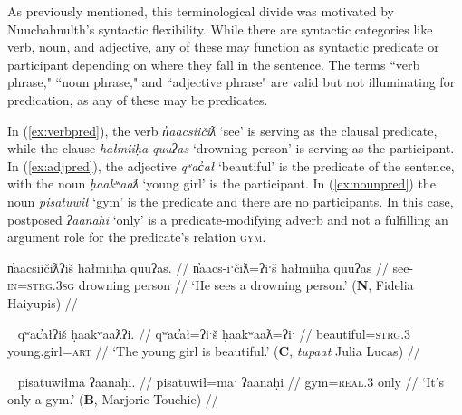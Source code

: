 As previously mentioned, this terminological divide was motivated by Nuuchahnulth's syntactic flexibility. While there are syntactic categories like verb, noun, and adjective, any of these may function as syntactic predicate or participant depending on where they fall in the sentence. The terms ``verb phrase," ``noun phrase," and ``adjective phrase" are valid but not illuminating for predication, as any of these may be predicates.

In (\ref{ex:verbpred}), the verb \textit{n̓aacsiičiƛ} `see' is serving as the clausal predicate, while the clause \textit{hałmiiḥa quuʔas} `drowning person' is serving as the participant. In (\ref{ex:adjpred}), the adjective \textit{qʷac̓ał} `beautiful' is the predicate of the sentence, with the noun \textit{ḥaakʷaaƛ} `young girl' is the participant. In (\ref{ex:nounpred}) the noun \textit{pisatuwił} `gym' is the predicate and there are no participants. In this case, postposed \textit{ʔaanaḥi} `only' is a predicate-modifying adverb and not a fulfilling an argument role for the predicate's relation \textsc{gym}.

\begin{comment}
While all three words have semantic relations (\textsc{see}, \textsc{drown}, \textsc{person}), only one is the syntactic predicate of the sentence.	
\end{comment}

\ex \label{ex:verbpred}
\begingl
\glpreamble n̓aacsiičiƛʔiš hałmiiḥa quuʔas. //
\gla n̓aacs-iˑčiƛ=ʔiˑš hałmiiḥa quuʔas //
\glb see-\textsc{in}=\textsc{strg.3sg} drowning person //
\glft ‘He sees a drowning person.’ (\textbf{N}, Fidelia Haiyupis) //
\endgl
\xe

\ex~ \label{ex:adjpred}
\begingl
\glpreamble qʷac̓ałʔiš ḥaakʷaaƛʔi. //
\gla qʷac̓ał=ʔiˑš ḥaakʷaaƛ=ʔiˑ //
\glb beautiful=\textsc{strg.3} young.girl=\textsc{art} //
\glft ‘The young girl is beautiful.’ (\textbf{C}, \textit{tupaat} Julia Lucas) //
\endgl
\xe

\ex~ \label{ex:nounpred}
\begingl
\glpreamble pisatuwiłma ʔaanaḥi. //
\gla pisatuwił=maˑ ʔaanaḥi //
\glb gym=\textsc{real.3} only //
\glft ‘It's only a gym.’ (\textbf{B}, Marjorie Touchie) //
\endgl
\xe

